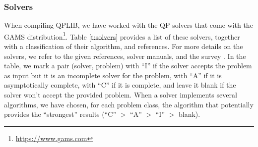 \subsubsection{Solvers}\label{subsec:solver}

When compiling QPLIB, we have worked with the QP solvers that come with the GAMS distribution\footnote{\url{https://www.gams.com}}.
Table \ref{t:solvers} provides a list of these solvers, together with a classification of their algorithm, and references.
For more details on the solvers, we refer to the given references, solver manuals, and the survey \cite{BuVi10}.
In the table, we mark a pair (solver, problem) with ``I'' if the solver accepts the problem as input but it is an incomplete solver for the problem, with ``A'' if it is asymptotically complete, with ``C'' if it is complete, and leave it blank if the solver won't accept the provided problem.
When a solver implements several algorithms, we have chosen, for each problem class, the algorithm that potentially provides the ``strongest'' results (``C'' $>$ ``A'' $>$ ``I'' $>$ blank).

